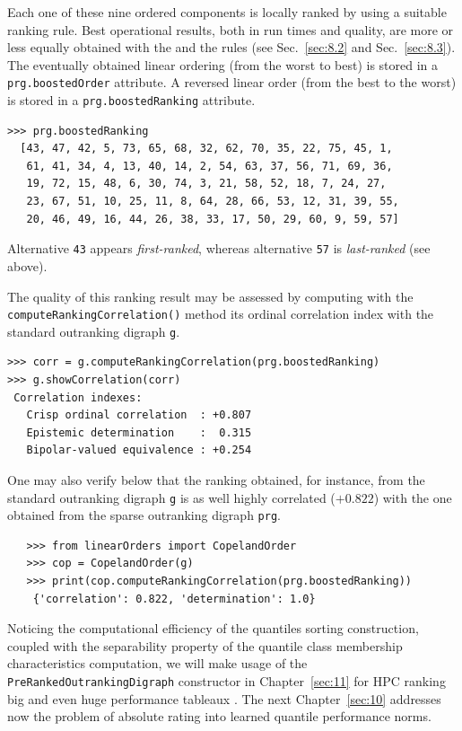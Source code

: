 Each one of these nine ordered components is locally ranked by using a suitable ranking rule. Best operational results, both in run times and quality, are more or less equally obtained with the \Copeland and the \NetFlows rules (see Sec.~\ref{sec:8.2} and Sec.~\ref{sec:8.3}). The eventually obtained linear ordering (from the worst to best) is stored in a \texttt{prg.boostedOrder} attribute. A reversed linear order (from the best to the worst) is stored in a \texttt{prg.boostedRanking} attribute.
  \begin{lstlisting}
>>> prg.boostedRanking
  [43, 47, 42, 5, 73, 65, 68, 32, 62, 70, 35, 22, 75, 45, 1,
   61, 41, 34, 4, 13, 40, 14, 2, 54, 63, 37, 56, 71, 69, 36,
   19, 72, 15, 48, 6, 30, 74, 3, 21, 58, 52, 18, 7, 24, 27,
   23, 67, 51, 10, 25, 11, 8, 64, 28, 66, 53, 12, 31, 39, 55,
   20, 46, 49, 16, 44, 26, 38, 33, 17, 50, 29, 60, 9, 59, 57]
\end{lstlisting}

Alternative \texttt{43} appears \emph{first-ranked}, whereas alternative \texttt{57} is \emph{last-ranked} (see above).

The quality of this ranking result may be assessed by computing with the \texttt{computeRankingCorrelation()} method its ordinal correlation index with the standard outranking digraph \texttt{g}.  
\begin{lstlisting}
>>> corr = g.computeRankingCorrelation(prg.boostedRanking)
>>> g.showCorrelation(corr)
 Correlation indexes:
   Crisp ordinal correlation  : +0.807
   Epistemic determination    :  0.315
   Bipolar-valued equivalence : +0.254
\end{lstlisting}

One may also verify below that the \Copeland ranking obtained, for instance, from the standard outranking digraph \texttt{g} is as well highly correlated ($+0.822$) with the one obtained from the sparse outranking digraph \texttt{prg}.
\begin{lstlisting}
   >>> from linearOrders import CopelandOrder
   >>> cop = CopelandOrder(g)
   >>> print(cop.computeRankingCorrelation(prg.boostedRanking))
    {'correlation': 0.822, 'determination': 1.0}
\end{lstlisting}

\vspace{\baselineskip}
Noticing the computational efficiency of the quantiles sorting construction, coupled with the separability property of the quantile class membership characteristics computation, we will make usage of the \texttt{PreRankedOutrankingDigraph} constructor in Chapter~\ref{sec:11} for HPC ranking big and even huge performance tableaux \citep{BIS-2016}. The next Chapter~\ref{sec:10} addresses now the problem of absolute rating into learned quantile performance norms.

{}
{}

%
%
 
